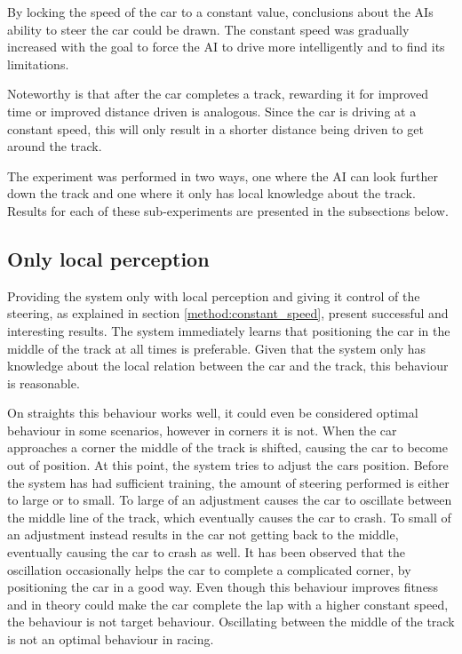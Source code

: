 By locking the speed of the car to a constant value, conclusions about the AIs ability to steer the car could be drawn. The constant speed was gradually increased with the goal to force the AI to drive more intelligently and to find its limitations. 

Noteworthy is that after the car completes a track, rewarding it for improved time or improved distance driven is analogous. Since the car is driving at a constant speed, this will only result in a shorter distance being driven to get around the track.

The experiment was performed in two ways, one where the AI can look further down the track and one where it only has local knowledge about the track. Results for each of these sub-experiments are presented in the subsections below.

\subsection{Only local perception}
Providing the system only with local perception and giving it control of the steering, as explained in section \ref{method:constant_speed}, present successful and interesting results. The system immediately learns that positioning the car in the middle of the track at all times is preferable. Given that the system only has knowledge about the local relation between the car and the track, this behaviour is reasonable.

On straights this behaviour works well, it could even be considered optimal behaviour in some scenarios, however in corners it is not. When the car approaches a corner the middle of the track is shifted, causing the car to become out of position. At this point, the system tries to adjust the cars position. Before the system has had sufficient training, the amount of steering performed is either to large or to small. To large of an adjustment causes the car to oscillate between the middle line of the track, which eventually causes the car to crash. To small of an adjustment instead results in the car not getting back to the middle, eventually causing the car to crash as well. It has been observed that the oscillation occasionally helps the car to complete a complicated corner, by positioning the car in a good way. Even though this behaviour improves fitness and in theory could make the car complete the lap with a higher constant speed, the behaviour is not target behaviour. Oscillating between the middle of the track is not an optimal behaviour in racing.


